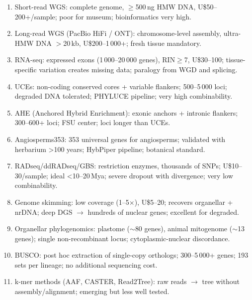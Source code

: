\clearpage
\begin{revise}\small
\begin{enumerate}[itemsep=0pt, topsep=0pt, parsep=0pt]
    \item Short-read WGS: complete genome, $\geq$500\,ng HMW DNA, U\$50--200+/sample; poor for museum; bioinformatics very high.
    \item Long-read WGS (PacBio HiFi / ONT): chromosome-level assembly, ultra-HMW DNA $>$20\,kb, U\$200--1\,000+; fresh tissue mandatory.
    \item RNA-seq: expressed exons (1\,000--20\,000 genes), RIN$\geq$7, U\$30--100; tissue-specific variation creates missing data; paralogy from WGD and splicing.
    \item UCEs: non-coding conserved cores + variable flankers; 500--5\,000 loci; degraded DNA tolerated; PHYLUCE pipeline; very high combinability.
    \item AHE (Anchored Hybrid Enrichment): exonic anchors + intronic flankers; 300--600+ loci; FSU center; loci longer than UCEs.
    \item Angiosperms353: 353 universal genes for angiosperms; validated with herbarium >100 years; HybPiper pipeline; botanical standard.
    \item RADseq/ddRADseq/GBS: restriction enzymes, thousands of SNPs; U\$10--30/sample; ideal <10--20\,Mya; severe dropout with divergence; very low combinability.
    \item Genome skimming: low coverage (1--5$\times$), U\$5--20; recovers organellar + nrDNA; deep DGS $\to$ hundreds of nuclear genes; excellent for degraded.
    \item Organellar phylogenomics: plastome ($\sim$80 genes), animal mitogenome ($\sim$13 genes); single non-recombinant locus; cytoplasmic-nuclear discordance.
    \item BUSCO: post hoc extraction of single-copy orthologs; 300--5\,000+ genes; 193 sets per lineage; no additional sequencing cost.
    \item k-mer methods (AAF, CASTER, Read2Tree): raw reads $\to$ tree without assembly/alignment; emerging but less well tested.
\end{enumerate}
\end{revise}

\clearpage

\printbibliography[heading=subbibliography,title={References}]

